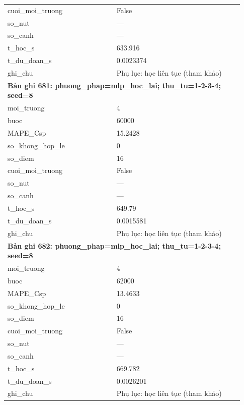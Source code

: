 \begin{longtable}{p{0.43\linewidth}p{0.50\linewidth}}
cuoi\_\allowbreak moi\_\allowbreak truong & False \\
so\_\allowbreak nut & — \\
so\_\allowbreak canh & — \\
t\_\allowbreak hoc\_\allowbreak s & 633.916 \\
t\_\allowbreak du\_\allowbreak doan\_\allowbreak s & 0.0023374 \\
ghi\_\allowbreak chu & Phụ lục: học liên tục (tham khảo) \\
\midrule
\multicolumn{2}{p{0.95\linewidth}}{\textbf{Bản ghi 681: phuong\_phap=mlp\_hoc\_lai; thu\_tu=1-2-3-4; seed=8}} \\
moi\_\allowbreak truong & 4 \\
buoc & 60000 \\
MAPE\_\allowbreak Csp & 15.2428 \\
so\_\allowbreak khong\_\allowbreak hop\_\allowbreak le & 0 \\
so\_\allowbreak diem & 16 \\
cuoi\_\allowbreak moi\_\allowbreak truong & False \\
so\_\allowbreak nut & — \\
so\_\allowbreak canh & — \\
t\_\allowbreak hoc\_\allowbreak s & 649.79 \\
t\_\allowbreak du\_\allowbreak doan\_\allowbreak s & 0.0015581 \\
ghi\_\allowbreak chu & Phụ lục: học liên tục (tham khảo) \\
\midrule
\multicolumn{2}{p{0.95\linewidth}}{\textbf{Bản ghi 682: phuong\_phap=mlp\_hoc\_lai; thu\_tu=1-2-3-4; seed=8}} \\
moi\_\allowbreak truong & 4 \\
buoc & 62000 \\
MAPE\_\allowbreak Csp & 13.4633 \\
so\_\allowbreak khong\_\allowbreak hop\_\allowbreak le & 0 \\
so\_\allowbreak diem & 16 \\
cuoi\_\allowbreak moi\_\allowbreak truong & False \\
so\_\allowbreak nut & — \\
so\_\allowbreak canh & — \\
t\_\allowbreak hoc\_\allowbreak s & 669.782 \\
t\_\allowbreak du\_\allowbreak doan\_\allowbreak s & 0.0026201 \\
ghi\_\allowbreak chu & Phụ lục: học liên tục (tham khảo) \\

\end{longtable}
